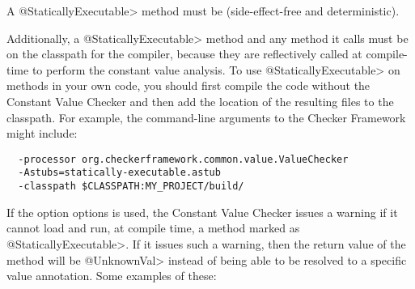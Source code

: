 A \<@StaticallyExecutable> method must
be  (side-effect-free and
deterministic).

Additionally, a \<@StaticallyExecutable> method and any method it calls must be on
the classpath for the compiler, because they are reflectively called at
compile-time to perform the constant value analysis.
To use \<@StaticallyExecutable> on methods in your own code, you should
first compile the code without the Constant Value Checker and then add
the location of the resulting  files to the
classpath. For example, the command-line arguments to the Checker Framework
might include:
\begin{Verbatim}
  -processor org.checkerframework.common.value.ValueChecker
  -Astubs=statically-executable.astub
  -classpath $CLASSPATH:MY_PROJECT/build/
\end{Verbatim}



If the option  options is used, the Constant Value Checker issues a warning if it cannot load and run, at
compile time, a method marked as \<@StaticallyExecutable>.  If it issues
such a warning, then the return value of the method will be \<@UnknownVal>
instead of being able to be resolved to a specific value annotation.
Some examples of these:


